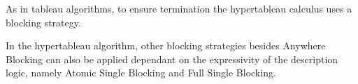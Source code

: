 As in tableau algorithms, to ensure termination the hypertableau calculus uses a blocking strategy.

In the hypertableau algorithm, other blocking strategies besides \textsf{Anywhere Blocking} can also
be applied dependant on the expressivity of the description logic, namely \textsf{Atomic Single
  Blocking} and \textsf{Full Single Blocking.}













